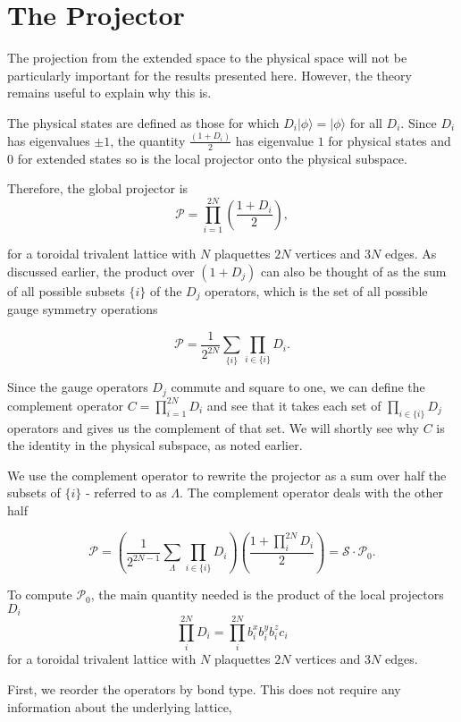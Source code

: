 \hypertarget{app-the-projector}{%
\section{The Projector}\label{app-the-projector}}

The projection from the extended space to the physical space will not be particularly important for the results presented here. However, the theory remains useful to explain why this is.

The physical states are defined as those for which \(D_i |\phi\rangle = |\phi\rangle\) for all \(D_i\). Since \(D_i\) has eigenvalues \(\pm1\), the quantity \(\tfrac{(1+D_i)}{2}\) has eigenvalue \(1\) for physical states and \(0\) for extended states so is the local projector onto the physical subspace.

Therefore, the global projector is \[ \mathcal{P} = \prod_{i=1}^{2N} \left( \frac{1 + D_i}{2}\right),\]

for a toroidal trivalent lattice with \(N\) plaquettes \(2N\) vertices and \(3N\) edges. As discussed earlier, the product over \((1 + D_j)\) can also be thought of as the sum of all possible subsets \(\{i\}\) of the \(D_j\) operators, which is the set of all possible gauge symmetry operations

\[ \mathcal{P} = \frac{1}{2^{2N}} \sum_{\{i\}} \prod_{i\in\{i\}} D_i.\]

Since the gauge operators \(D_j\) commute and square to one, we can define the complement operator \(C = \prod_{i=1}^{2N} D_i\) and see that it takes each set of \(\prod_{i \in \{i\}} D_j\) operators and gives us the complement of that set. We will shortly see why \(C\) is the identity in the physical subspace, as noted earlier.

We use the complement operator to rewrite the projector as a sum over half the subsets of \(\{i\}\) - referred to as \(\Lambda\). The complement operator deals with the other half

\[ \mathcal{P} =  \left( \frac{1}{2^{2N-1}} \sum_{\Lambda} \prod_{i\in\{i\}} D_i\right) \left(\frac{1 + \prod_i^{2N} D_i}{2}\right) = \mathcal{S} \cdot \mathcal{P}_0.\]

To compute \(\mathcal{P}_0\), the main quantity needed is the product of the local projectors \(D_i\) \[\prod_i^{2N} D_i = \prod_i^{2N} b^x_i b^y_i b^z_i c_i \] for a toroidal trivalent lattice with \(N\) plaquettes \(2N\) vertices and \(3N\) edges.

First, we reorder the operators by bond type. This does not require any information about the underlying lattice,


